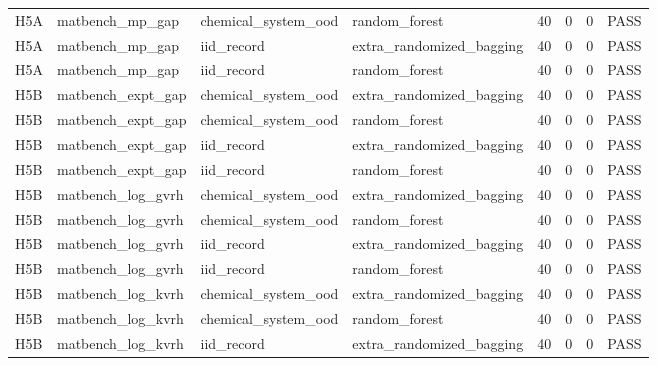 \documentclass[10pt]{article}
\begin{document}
\begin{landscape}
\begin{longtable}{L{.32in}L{1.05in}L{1.2in}L{1.3in}L{.42in}L{.42in}L{.42in}L{.48in}}
H5A & matbench\_\allowbreak{}mp\_\allowbreak{}gap & chemical\_\allowbreak{}system\_\allowbreak{}ood & random\_\allowbreak{}forest & 40 & 0 & 0 & PASS\\
H5A & matbench\_\allowbreak{}mp\_\allowbreak{}gap & iid\_\allowbreak{}record & extra\_\allowbreak{}randomized\_\allowbreak{}bagging & 40 & 0 & 0 & PASS\\
H5A & matbench\_\allowbreak{}mp\_\allowbreak{}gap & iid\_\allowbreak{}record & random\_\allowbreak{}forest & 40 & 0 & 0 & PASS\\
H5B & matbench\_\allowbreak{}expt\_\allowbreak{}gap & chemical\_\allowbreak{}system\_\allowbreak{}ood & extra\_\allowbreak{}randomized\_\allowbreak{}bagging & 40 & 0 & 0 & PASS\\
H5B & matbench\_\allowbreak{}expt\_\allowbreak{}gap & chemical\_\allowbreak{}system\_\allowbreak{}ood & random\_\allowbreak{}forest & 40 & 0 & 0 & PASS\\
H5B & matbench\_\allowbreak{}expt\_\allowbreak{}gap & iid\_\allowbreak{}record & extra\_\allowbreak{}randomized\_\allowbreak{}bagging & 40 & 0 & 0 & PASS\\
H5B & matbench\_\allowbreak{}expt\_\allowbreak{}gap & iid\_\allowbreak{}record & random\_\allowbreak{}forest & 40 & 0 & 0 & PASS\\
H5B & matbench\_\allowbreak{}log\_\allowbreak{}gvrh & chemical\_\allowbreak{}system\_\allowbreak{}ood & extra\_\allowbreak{}randomized\_\allowbreak{}bagging & 40 & 0 & 0 & PASS\\
H5B & matbench\_\allowbreak{}log\_\allowbreak{}gvrh & chemical\_\allowbreak{}system\_\allowbreak{}ood & random\_\allowbreak{}forest & 40 & 0 & 0 & PASS\\
H5B & matbench\_\allowbreak{}log\_\allowbreak{}gvrh & iid\_\allowbreak{}record & extra\_\allowbreak{}randomized\_\allowbreak{}bagging & 40 & 0 & 0 & PASS\\
H5B & matbench\_\allowbreak{}log\_\allowbreak{}gvrh & iid\_\allowbreak{}record & random\_\allowbreak{}forest & 40 & 0 & 0 & PASS\\
H5B & matbench\_\allowbreak{}log\_\allowbreak{}kvrh & chemical\_\allowbreak{}system\_\allowbreak{}ood & extra\_\allowbreak{}randomized\_\allowbreak{}bagging & 40 & 0 & 0 & PASS\\
H5B & matbench\_\allowbreak{}log\_\allowbreak{}kvrh & chemical\_\allowbreak{}system\_\allowbreak{}ood & random\_\allowbreak{}forest & 40 & 0 & 0 & PASS\\
H5B & matbench\_\allowbreak{}log\_\allowbreak{}kvrh & iid\_\allowbreak{}record & extra\_\allowbreak{}randomized\_\allowbreak{}bagging & 40 & 0 & 0 & PASS\\

\end{longtable}
\end{landscape}
\end{document}
